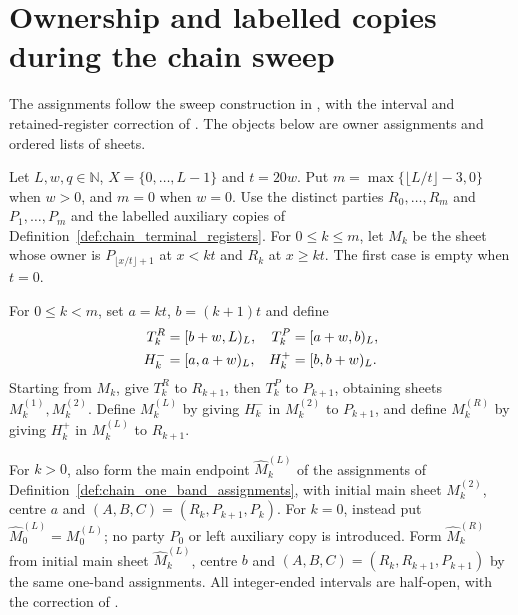 \section{Ownership and labelled copies during the chain sweep}

The assignments follow the sweep construction in
\cite[Part~II]{TNLean2026OneDimensional}, with the interval and
retained-register correction of
\cite{gap:tnlean_one_dimensional_band_sweep_corrections}.
The objects below are owner assignments and ordered lists of sheets.

\begin{definition}
    \label{def:chain_sweep_stage_assignments}
    \leanok
    Let $L,w,q\in\mathbb N$, $X=\{0,\ldots,L-1\}$ and $t=20w$.
    Put $m=\max\{\lfloor L/t\rfloor-3,0\}$ when $w>0$, and $m=0$
    when $w=0$. Use the distinct parties $R_0,\ldots,R_m$ and
    $P_1,\ldots,P_m$ and the labelled auxiliary copies of
    Definition~\ref{def:chain_terminal_registers}.
    For $0\le k\le m$, let $M_k$ be the sheet whose owner is
    $P_{\lfloor x/t\rfloor+1}$ at $x<kt$ and $R_k$ at $x\ge kt$.
    The first case is empty when $t=0$.

    For $0\le k<m$, set $a=kt$, $b=(k+1)t$ and define
    \begin{align}
        T_k^R & =\lbrack b+w,L)_L, & T_k^P & =\lbrack a+w,b)_L,\notag \\
        H_k^- & =\lbrack a,a+w)_L, & H_k^+ & =\lbrack b,b+w)_L.\notag
    \end{align}
    Starting from $M_k$, give $T_k^R$ to $R_{k+1}$, then $T_k^P$ to
    $P_{k+1}$, obtaining sheets $M_k^{(1)},M_k^{(2)}$.
    Define $M_k^{(L)}$ by giving $H_k^-$ in $M_k^{(2)}$ to $P_{k+1}$,
    and define $M_k^{(R)}$ by giving $H_k^+$ in $M_k^{(L)}$ to $R_{k+1}$.

    For $k>0$, also form the main endpoint $\widehat M_k^{(L)}$ of the
    assignments of Definition~\ref{def:chain_one_band_assignments}, with
    initial main sheet $M_k^{(2)}$, centre $a$ and
    $(A,B,C)=(R_k,P_{k+1},P_k)$.
    For $k=0$, instead put $\widehat M_0^{(L)}=M_0^{(L)}$; no party
    $P_0$ or left auxiliary copy is introduced.
    Form $\widehat M_k^{(R)}$ from initial main sheet
    $\widehat M_k^{(L)}$, centre $b$ and
    $(A,B,C)=(R_k,R_{k+1},P_{k+1})$ by the same one-band assignments.
    All integer-ended intervals are half-open, with the correction of
    \cite{gap:tnlean_one_dimensional_band_sweep_corrections}.
\end{definition}

